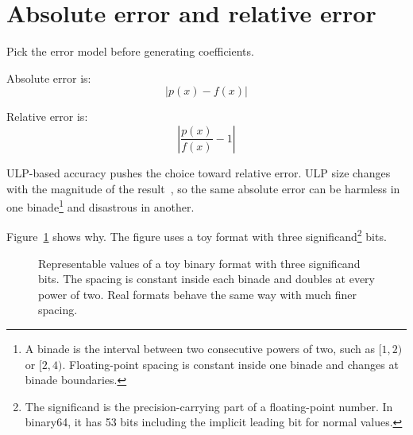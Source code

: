 \documentclass[manuscript, nonacm]{acmart}
\begin{document}


    \section{Absolute error and relative error}
    \label{sec:relabs}

    Pick the error model before generating coefficients.

    Absolute error is:
    \[ |p(x) - f(x)| \]

    Relative error is:
    \[ \left|\frac{p(x)}{f(x)} - 1\right| \]

    ULP-based accuracy pushes the choice toward relative error. ULP size changes
    with the magnitude of the result~\cite{handbook}, so the same absolute error
    can be harmless in one binade\footnote{A binade is the interval between two consecutive powers of two, such as $[1,2)$ or $[2,4)$. Floating-point spacing is constant inside one binade and changes at binade boundaries.} and disastrous in another.

    Figure~\ref{fig:ulpspacing} shows why. The figure uses a toy format with three significand\footnote{The significand is the precision-carrying part of a floating-point number. In binary64, it has 53 bits including the implicit leading bit for normal values.} bits.

    \begin{figure}[H]
        \centering
        \caption{Representable values of a toy binary format with three
        significand bits. The spacing is constant inside each binade and
        doubles at every power of two. Real formats behave the same way with
        much finer spacing.}
        \label{fig:ulpspacing}
    \end{figure}
\end{document}
